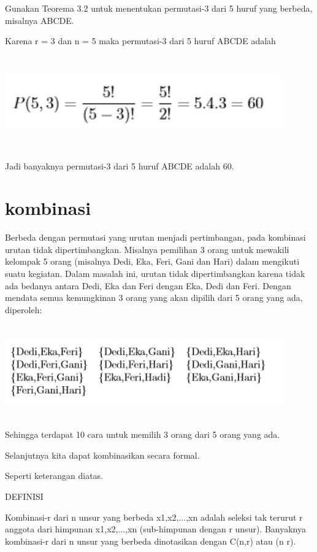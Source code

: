 \documentclass[11pt,fleqn]{book} %
\begin{document}
Gunakan Teorema 3.2 untuk menentukan permutasi-3 dari 5 huruf yang berbeda, misalnya ABCDE.


Karena r = 3 dan n = 5 maka permutasi-3 dari 5 huruf ABCDE adalah

\includegraphics[width = 12cm, height= 4cm]{Pictures/herlin3.png}

Jadi banyaknya permutasi-3 dari 5 huruf ABCDE adalah 60.

\section{kombinasi}


Berbeda dengan permutasi yang urutan menjadi pertimbangan, pada kombinasi urutan tidak dipertimbangkan. Misalnya pemilihan 3 orang untuk mewakili kelompak 5 orang (misalnya Dedi, Eka, Feri, Gani dan Hari) dalam mengikuti suatu kegiatan. Dalam masalah ini, urutan tidak dipertimbangkan karena tidak ada bedanya antara Dedi, Eka dan Feri dengan Eka, Dedi dan Feri. Dengan mendata semua kemungkinan 3 orang yang akan dipilih dari 5 orang yang ada, diperoleh:

\includegraphics[width = 12cm, height= 4cm]{Pictures/herlin4.png}

Sehingga terdapat 10 cara untuk memilih 3 orang dari 5 orang yang ada.

Selanjutnya kita dapat kombinasikan secara formal.

Seperti keterangan diatas.



DEFINISI


Kombinasi-r dari n unsur yang berbeda x1,x2,...,xn adalah seleksi tak terurut r anggota dari himpunan {x1,x2,...,xn} (sub-himpunan dengan r unsur). Banyaknya kombinasi-r dari n unsur yang berbeda dinotasikan dengan C(n,r) atau (n r).
\end{document}
